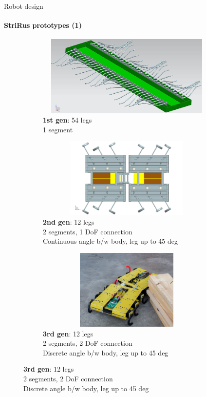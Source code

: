 \documentclass[aspectratio=169]{beamer}
\begin{document}
\begin{frame}[t]{Robot design}
    \framesubtitle{StriRus prototypes (1)}
    \vspace{-0.7cm}
    \begin{figure}[H]
        \begin{subfigure}[t]{0.32\textwidth}
            \centering\includegraphics[height=4cm,width=1\textwidth,keepaspectratio]{strirus_0.png}
            \caption*{\textbf{1st gen}: 54 legs \\ 1 segment}
        \end{subfigure}
        \hfill
        \begin{subfigure}[t]{0.32\textwidth}
            \centering\includegraphics[height=4cm,width=1\textwidth,keepaspectratio]{strirus_1.png}
            \caption*{\textbf{2nd gen}: 12 legs \\ 2 segments, 1 DoF connection \\ Continuous angle b/w body, leg up to 45 deg}
        \end{subfigure}
        \hfill
        \begin{subfigure}[t]{0.32\textwidth}
            \centering\includegraphics[height=4cm,width=1\textwidth,keepaspectratio]{strirus_2.jpg}
            \caption*{\textbf{3rd gen}: 12 legs \\ 2 segments, 2 DoF connection \\ Discrete angle b/w body, leg up to 45 deg}
        \end{subfigure}
        \hfill
    \end{figure}
\end{frame}
\end{document}
